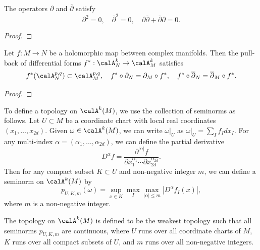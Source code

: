 \begin{proposition}\label{prop:partial_and_partial_bar_are_differential_operators}
	The operators \(\partial\) and \(\overline{\partial}\) satisfy
	\[ \partial^2 = 0, \quad \overline{\partial}^2 = 0, \quad \partial \overline{\partial} + \overline{\partial} \partial = 0. \]
\end{proposition}
\begin{proof}
\end{proof}

\begin{proposition}\label{prop:holomorphic_pull_back_compatiable_with_A^pq}
	Let \(f: M \to N\) be a holomorphic map between complex manifolds.
	Then the pull-back of differential forms \(f^*: \calA^{k}_N \to \calA^{k}_M\) satisfies
	\[ f^*(\calA^{p,q}_N) \subset \calA^{p,q}_M, \quad f^* \circ \partial_N = \partial_M \circ f^*, \quad f^* \circ \overline{\partial}_N = \overline{\partial}_M \circ f^*. \]
\end{proposition}
\begin{proof}
\end{proof}

\begin{construction}
	To define a topology on \(\calA^{k}(M)\), we use the collection of seminorms as follows.
	Let \(U \subset M\) be a coordinate chart with local real coordinates \((x_1, \ldots, x_{2d})\).
	Given \(\omega \in \calA^{k}(M)\), we can write \(\omega|_U\) as \(\omega|_U = \sum_I f_I d x_I\).
	For any multi-index \(\alpha = (\alpha_1, \ldots, \alpha_{2d})\), we can define the partial derivative
	\[ D^{\alpha} f = \frac{\partial^{|\alpha|} f}{\partial x_1^{\alpha_1} \cdots \partial x_{2d}^{\alpha_{2d}}}. \]
	Then for any compact subset \(K \subset U\) and non-negative integer \(m\), we can define a seminorm on \(\calA^{k}(M)\) by
	\[ p_{U, K, m}(\omega) = \sup_{x \in K} \max_{I} \max_{|\alpha| \leq m} |D^{\alpha} f_I(x)|, \]
	where \(m\) is a non-negative integer.

	The topology on \(\calA^{k}(M)\) is defined to be the weakest topology such that all seminorms \(p_{U, K, m}\) are continuous, where \(U\) runs over all coordinate charts of \(M\), \(K\) runs over all compact subsets of \(U\), and \(m\) runs over all non-negative integers.
\end{construction}

